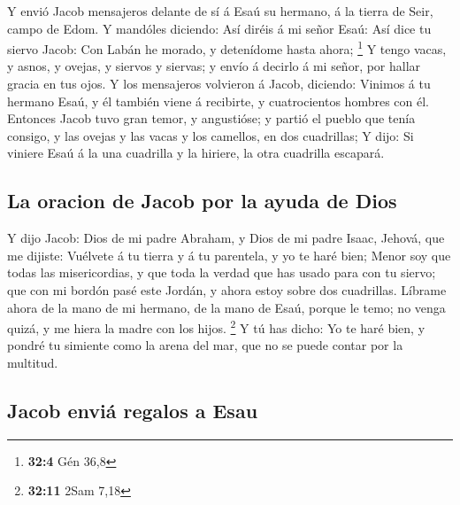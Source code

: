  Y envió Jacob mensajeros delante de sí á Esaú su hermano,
á la tierra de Seir, campo de Edom.  Y mandóles diciendo:
Así diréis á mi señor Esaú: Así dice tu siervo Jacob: Con Labán he
morado, y detenídome hasta ahora; \footnote{\textbf{32:4} Gén 36,8}
 Y tengo vacas, y asnos, y ovejas, y siervos y siervas; y
envío á decirlo á mi señor, por hallar gracia en tus ojos.
 Y los mensajeros volvieron á Jacob, diciendo: Vinimos á
tu hermano Esaú, y él también viene á recibirte, y cuatrocientos hombres
con él.  Entonces Jacob tuvo gran temor, y angustióse; y
partió el pueblo que tenía consigo, y las ovejas y las vacas y los
camellos, en dos cuadrillas;  Y dijo: Si viniere Esaú á la
una cuadrilla y la hiriere, la otra cuadrilla escapará.

\hypertarget{la-oracion-de-jacob-por-la-ayuda-de-dios}{%
\subsection{La oracion de Jacob por la ayuda de
Dios}\label{la-oracion-de-jacob-por-la-ayuda-de-dios}}

 Y dijo Jacob: Dios de mi padre Abraham, y Dios de mi
padre Isaac, Jehová, que me dijiste: Vuélvete á tu tierra y á tu
parentela, y yo te haré bien;  Menor soy que todas las
misericordias, y que toda la verdad que has usado para con tu siervo;
que con mi bordón pasé este Jordán, y ahora estoy sobre dos cuadrillas.
 Líbrame ahora de la mano de mi hermano, de la mano de
Esaú, porque le temo; no venga quizá, y me hiera la madre con los hijos.
\footnote{\textbf{32:11} 2Sam 7,18}  Y tú has dicho: Yo
te haré bien, y pondré tu simiente como la arena del mar, que no se
puede contar por la multitud.

\hypertarget{jacob-enviuxe1-regalos-a-esau}{%
\subsection{Jacob enviá regalos a
Esau}\label{jacob-enviuxe1-regalos-a-esau}}

